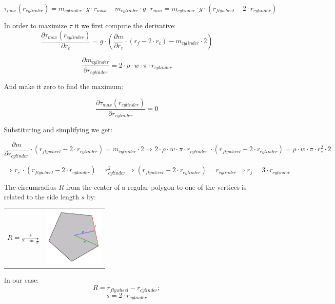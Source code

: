 \[ \tau _{max} (r_{cylinder}) =  m_{cylinder} \cdot g \cdot r_{max} -  m_{cylinder} \cdot g \cdot r_{min} =
	m_{cylinder}\cdot g \cdot (r_{flywheel} - 2 \cdot r_{cylinder}) \]

In order to maximize $\tau$ it we first compute the derivative:
\[\frac{\partial \tau _{max} (r_{cylinder})}{\partial r_c} = g \cdot(\frac{\partial m}{\partial r_c} \cdot (r_f - 2 \cdot r_c) -  m_{cylinder} \cdot 2)\]

\[ \frac{\partial  m_{cylinder}}{\partial r_{cylinder}} = 2 \cdot \rho \cdot w \cdot \pi \cdot  r_{cylinder}\]

And make it zero to find the maximum:

\[\frac{\partial \tau _{max} (r_{cylinder})}{\partial r_{cylinder}} = 0\]

Substituting and simplifying we get:

\[\frac{\partial m}{\partial r_{cylinder}} \cdot (r_{flywheel} - 2 \cdot r_{cylinder}) =
	m_{cylinder} \cdot 2 \Rightarrow 2 \cdot \rho \cdot w \cdot \pi \cdot  r_{cylinder}\ \cdot (r_{flywheel} - 2 \cdot r_{cylinder}) = \rho \cdot w \cdot \pi \cdot r_c^2 \cdot 2 \]

\[ \Rightarrow r_c\ \cdot (r_{flywheel} - 2 \cdot r_{cylinder}) =  r_{cylinder}^2
	\Rightarrow (r_{flywheel} - 2 \cdot r_{cylinder}) =  r_{cylinder}
	\Rightarrow \boxed{r_f = 3 \cdot r_{cylinder}}\]


The circumradius $R$ from the center of a regular polygon to one of the vertices is related to the side length $s$ by:

\begin{center}
	\begin{tabular}{ c  c }
		\(\displaystyle R=\frac {s}{2\cdot \sin{\frac {\pi} {n}}} \)
		 &
		\includegraphics[width=3cm]{img/PolygonParameters.png}
	\end{tabular}
\end{center}

In our case:
\[ R = r_{flywheel} - r_{cylinder}; \]
\[ s = 2 \cdot r_{cylinder}\]

